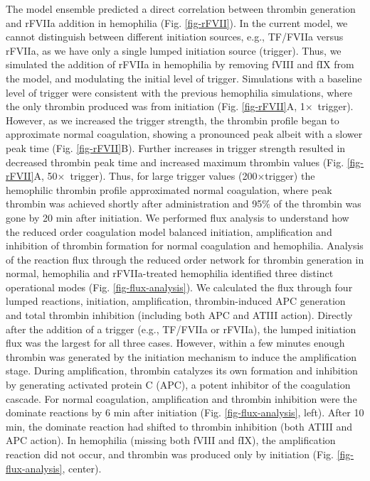 \documentclass[12pt]{article}
\begin{document}
The model ensemble predicted a direct correlation between thrombin generation and rFVIIa addition in hemophilia (Fig. \ref{fig-rFVII}).
In the current model, we cannot distinguish between different initiation sources, e.g., TF/FVIIa versus rFVIIa, as we have only a single lumped initiation source (trigger).
Thus, we simulated the addition of rFVIIa in hemophilia by removing fVIII and fIX from the model, and modulating the initial level of trigger.
Simulations with a baseline level of trigger were consistent with the previous hemophilia simulations, where the only thrombin produced was from initiation (Fig. \ref{fig-rFVII}A, 1$\times$~trigger).
However, as we increased the trigger strength, the thrombin profile began to approximate normal coagulation, showing a pronounced peak albeit with a slower peak time (Fig. \ref{fig-rFVII}B).
Further increases in trigger strength resulted in decreased thrombin peak time and increased maximum thrombin values (Fig. \ref{fig-rFVII}A, 50$\times$~trigger). 
Thus, for large trigger values (200$\times$trigger) the hemophilic thrombin profile approximated normal coagulation, where peak thrombin was achieved shortly 
after administration and 95\% of the thrombin was gone by 20 min after initiation. 
We performed flux analysis to understand how the reduced order coagulation model balanced initiation, amplification and inhibition of thrombin formation for normal coagulation and hemophilia.
Analysis of the reaction flux through the reduced order network for thrombin generation in normal, hemophilia and rFVIIa-treated hemophilia identified three distinct operational modes (Fig. \ref{fig-flux-analysis}).
We calculated the flux through four lumped reactions, initiation, amplification, thrombin-induced APC generation and total thrombin inhibition (including both APC and ATIII action).
Directly after the addition of a trigger (e.g., TF/FVIIa or rFVIIa), the lumped initiation flux was the largest for all three cases.
However, within a few minutes enough thrombin was generated by the initiation mechanism to induce the amplification stage. 
During amplification, thrombin catalyzes its own formation and inhibition by generating activated protein C (APC), a potent inhibitor of the coagulation cascade.
For normal coagulation, amplification and thrombin inhibition were the dominate reactions by 6 min after initiation (Fig. \ref{fig-flux-analysis}, left). 
After 10 min, the dominate reaction had shifted to thrombin inhibition (both ATIII and APC action). 
In hemophilia (missing both fVIII and fIX), the amplification reaction did not occur, and thrombin was produced only by initiation (Fig. \ref{fig-flux-analysis}, center).
\end{document}
